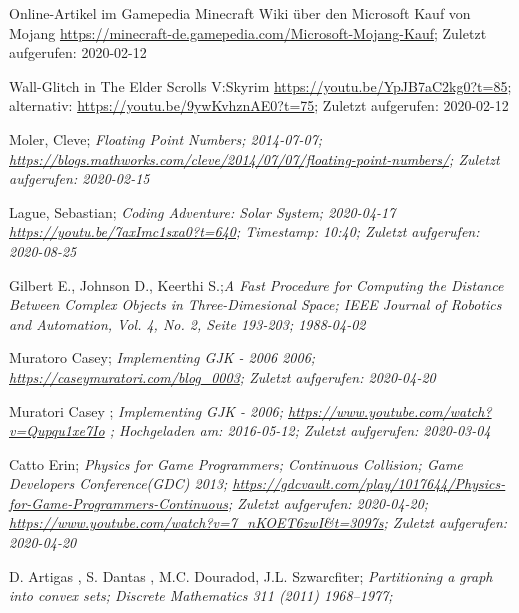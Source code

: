 

		Online-Artikel im Gamepedia Minecraft Wiki über den Microsoft Kauf von Mojang
		\url{https://minecraft-de.gamepedia.com/Microsoft-Mojang-Kauf}; Zuletzt aufgerufen: 2020-02-12

		Wall-Glitch in The Elder Scrolls V:Skyrim
		\url{https://youtu.be/YpJB7aC2kg0?t=85}; 
		alternativ: \url{https://youtu.be/9ywKvhznAE0?t=75};
		Zuletzt aufgerufen: 2020-02-12

		Moler, Cleve; \sl{Floating Point Numbers}; 2014-07-07;
		\url{https://blogs.mathworks.com/cleve/2014/07/07/floating-point-numbers/};
		Zuletzt aufgerufen: 2020-02-15
		
		Lague, Sebastian; \sl{Coding Adventure: Solar System}; 2020-04-17
		\url{https://youtu.be/7axImc1sxa0?t=640};
		Timestamp: 10:40;
		Zuletzt aufgerufen: 2020-08-25

		Gilbert E., Johnson D., Keerthi S.;\sl{A Fast Procedure for Computing the Distance Between Complex Objects in Three-Dimesional Space};
		IEEE Journal of Robotics and Automation, Vol. 4, No. 2, Seite 193-203; 1988-04-02

		Muratoro Casey; \sl{Implementing GJK - 2006}
		2006;
		\url{https://caseymuratori.com/blog_0003}; Zuletzt aufgerufen: 2020-04-20

		Muratori Casey ; \sl{Implementing GJK - 2006};
		\url{https://www.youtube.com/watch?v=Qupqu1xe7Io} ; Hochgeladen am: 2016-05-12; Zuletzt aufgerufen: 2020-03-04

		Catto Erin;  \sl{Physics for Game Programmers; Continuous Collision};
		Game Developers Conference(GDC) 2013;
		\url{https://gdcvault.com/play/1017644/Physics-for-Game-Programmers-Continuous}; Zuletzt aufgerufen: 2020-04-20;
		\url{https://www.youtube.com/watch?v=7_nKOET6zwI&t=3097s}; Zuletzt aufgerufen: 2020-04-20
		
		D. Artigas , S. Dantas , M.C. Douradod, J.L. Szwarcfiter; \sl{Partitioning a graph into convex sets};
		Discrete Mathematics 311 (2011) 1968–1977;
